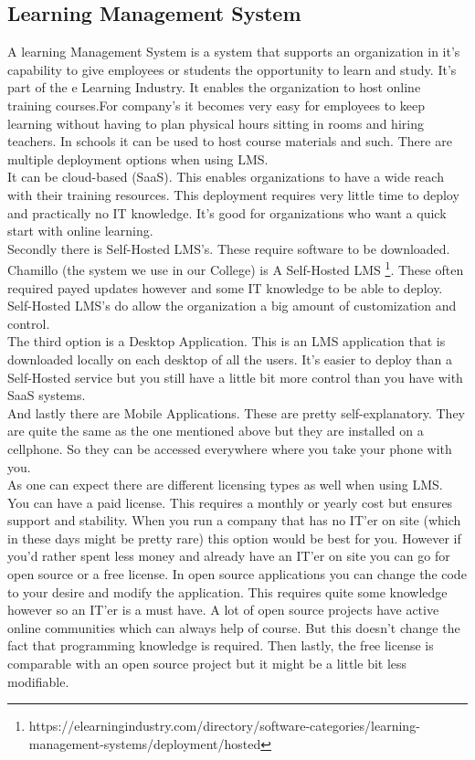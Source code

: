 \subsection{Learning Management System}
A learning Management System is a system that supports an organization in it's capability to give employees or students the opportunity to learn and study. It's part of the e Learning Industry. It enables the organization to host online training courses.For company's it becomes very easy for employees to keep learning without having to plan physical hours sitting in rooms and hiring teachers. In schools it can be used to host course materials and such. There are multiple deployment options when using LMS. \\
It can be cloud-based (SaaS). This enables organizations to have a wide reach with their training resources. This deployment requires very little time to deploy and practically no IT knowledge. It's good for organizations who want a quick start with online learning.\\
Secondly there is Self-Hosted LMS's. These require software to be downloaded. Chamillo (the system we use in our College) is A Self-Hosted LMS \footnote{https://elearningindustry.com/directory/software-categories/learning-management-systems/deployment/hosted}. These often required payed updates however and some IT knowledge to be able to deploy. Self-Hosted LMS's do allow the organization a big amount of customization and control.\\
The third option is a Desktop Application. This is an LMS application that is downloaded locally on each desktop of all the users. It's easier to deploy than a Self-Hosted service but you still have a little bit more control than you have with SaaS systems.\\
And lastly there are Mobile Applications. These are pretty self-explanatory. They are quite the same as the one mentioned above but they are installed on a cellphone. So they can be accessed everywhere where you take your phone with you.\\
As one can expect there are different licensing types as well when using LMS. You can have a paid license. This requires a monthly or yearly cost but ensures support and stability. When you run a company that has no IT'er on site (which in these days might be pretty rare) this option would be best for you. However if you'd rather spent less money and already have an IT'er on site you can go for open source or a free license. In open source applications you can change the code to your desire and modify the application. This requires quite some knowledge however so an IT'er is a must have. A lot of open source projects have active online communities which can always help of course. But this doesn't change the fact that programming knowledge is required. Then lastly, the free license is comparable with an open source project but it might be a little bit less modifiable.\\
